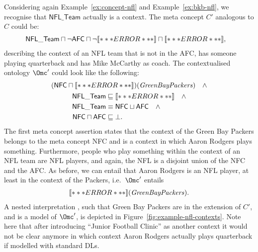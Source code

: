 \begin{example}\label{ex:nfl-with-contexts}
  Considering again Example~\ref{ex:concept-nfl} and Example~\ref{ex:bkb-nfl}, we recognise that
  $\mathsf{NFL\_Team}$ actually is a context. The meta concept $C'$ analogous to $C$ could be:
  \begin{align*}
    & \mathsf{NFL\_{}Team} \sqcap \lnot \mathsf{AFC} \sqcap
    \lnot\oax{\exists\plays.\mathsf{Quarterback}\sqsubseteq\bot} 
    \sqcap \oax{\mathsf{Coach}(\text{\textit{MikeMcCarthy}})},
  \end{align*}
  describing the context of an NFL team that is not in the AFC, has someone playing quarterback and
  has Mike McCarthy as coach.  The contextualised ontology $\Omc'$ could look like the following:
  \begin{gather*}
    (\mathsf{NFC} \sqcap
    \oax{(\exists\plays.\top)(\text{\textit{AaronRodgers}})})(\text{\textit{GreenBayPackers}})
    \quad\land\\ 
    \begin{aligned}
      \mathsf{NFL\_Team} & \sqsubseteq \oax{\exists\plays.\top \sqsubseteq
        \mathsf{NFL\_Player}}\quad\land\\ 
      \mathsf{NFL\_Team} & \equiv \mathsf{NFC} \sqcup \mathsf{AFC}\quad\land\\
      \mathsf{NFC} \sqcap \mathsf{AFC} & \sqsubseteq \bot.
    \end{aligned}
  \end{gather*}
  The first meta concept assertion states that the context of the Green Bay Packers belongs to the
  meta concept NFC and is a context in which Aaron Rodgers plays something. Furthermore, people who
  play something within the context of an NFL team are NFL players, and again, the NFL is a disjoint
  union of the NFC and the AFC. As before, we can entail that Aaron Rodgers is an NFL player, at
  least in the context of the Packers, i.e.\ $\Omc'$ entails
  \begin{gather*}
    \oax{\mathsf{NFL\_Player}(\text{\textit{AaronRodgers}})}(\text{\textit{GreenBayPackers}}).
  \end{gather*}
  A nested interpretation \J, such that Green Bay Packers are in the extension of $C'$, and \J is a
  model of $\Omc'$, is depicted in Figure~\ref{fig:example-nfl-contexts}. Note here that after
  introducing ``Junior Football Clinic'' as another context it would not be clear anymore in which
  context Aaron Rodgers actually plays quarterback if modelled with standard DLs.
\end{example}

